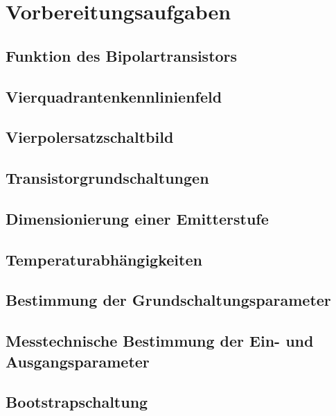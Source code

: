 \documentclass[a4paper, 12pt]{article}
\begin{document}
  
  \clearpage
  \setcounter{page}{1}

\section{Vorbereitungsaufgaben}

\subsection{Funktion des Bipolartransistors}


\subsection{Vierquadrantenkennlinienfeld}


\subsection{Vierpolersatzschaltbild}


\subsection{Transistorgrundschaltungen}


\subsection{Dimensionierung einer Emitterstufe}


\subsection{Temperaturabhängigkeiten}


\subsection{Bestimmung der Grundschaltungsparameter}


\subsection{Messtechnische Bestimmung der Ein- und Ausgangsparameter}


\subsection{Bootstrapschaltung}

\end{document}
